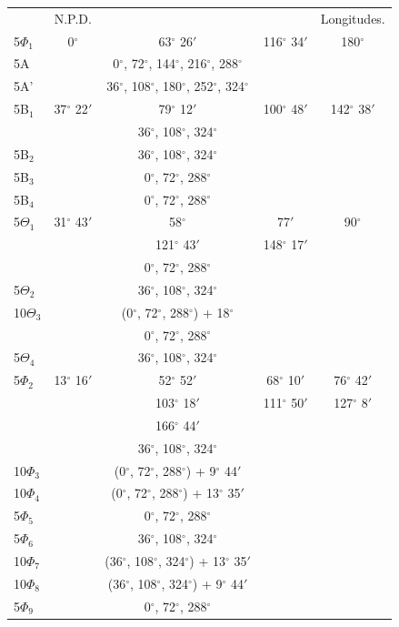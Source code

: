 \documentclass[11pt,a4paper]{book}
\begin{document}
\begin{center}
\begin{tabular}{lcccc}
 & N.P.D. & & & Longitudes. \\
5$\Phi_1$ & 0$^\circ$ & 63$^\circ$ 26$'$ & 116$^\circ$ 34$'$ & 180$^\circ$ \\
5A & & 0$^\circ$, 72$^\circ$, 144$^\circ$, 216$^\circ$, 288$^\circ$ & & \\
5A' & & 36$^\circ$, 108$^\circ$, 180$^\circ$, 252$^\circ$, 324$^\circ$ & & \\
5B$_1$ & 37$^\circ$ 22$'$ & 79$^\circ$ 12$'$ & 100$^\circ$ 48$'$ & 142$^\circ$ 38$'$ \\
 & & 36$^\circ$, 108$^\circ$, 324$^\circ$ & & \\
5B$_2$ & & 36$^\circ$, 108$^\circ$, 324$^\circ$ & & \\
5B$_3$ & & 0$^\circ$, 72$^\circ$, 288$^\circ$ & & \\
5B$_4$ & & 0$^\circ$, 72$^\circ$, 288$^\circ$ & & \\
5$\Theta_1$ & 31$^\circ$ 43$'$ & 58$^\circ$ & 77$'$ & 90$^\circ$ \\
 & & 121$^\circ$ 43$'$ & 148$^\circ$ 17$'$ & \\
 & & 0$^\circ$, 72$^\circ$, 288$^\circ$ & & \\
5$\Theta_2$ & & 36$^\circ$, 108$^\circ$, 324$^\circ$ & & \\
10$\Theta_3$ & & (0$^\circ$, 72$^\circ$, 288$^\circ$) + 18$^\circ$ & & \\
 & & 0$^\circ$, 72$^\circ$, 288$^\circ$ & & \\
5$\Theta_4$ & & 36$^\circ$, 108$^\circ$, 324$^\circ$ & & \\
5$\Phi_2$ & 13$^\circ$ 16$'$ & 52$^\circ$ 52$'$ & 68$^\circ$ 10$'$ & 76$^\circ$ 42$'$ \\
 & & 103$^\circ$ 18$'$ & 111$^\circ$ 50$'$ & 127$^\circ$ 8$'$ \\
 & & 166$^\circ$ 44$'$ & & \\
 & & 36$^\circ$, 108$^\circ$, 324$^\circ$ & & \\
10$\Phi_3$ & & (0$^\circ$, 72$^\circ$, 288$^\circ$) + 9$^\circ$ 44$'$ & & \\
10$\Phi_4$ & & (0$^\circ$, 72$^\circ$, 288$^\circ$) + 13$^\circ$ 35$'$ & & \\
5$\Phi_5$ & & 0$^\circ$, 72$^\circ$, 288$^\circ$ & & \\
5$\Phi_6$ & & 36$^\circ$, 108$^\circ$, 324$^\circ$ & & \\
10$\Phi_7$ & & (36$^\circ$, 108$^\circ$, 324$^\circ$) + 13$^\circ$ 35$'$ & & \\
10$\Phi_8$ & & (36$^\circ$, 108$^\circ$, 324$^\circ$) + 9$^\circ$ 44$'$ & & \\
5$\Phi_9$ & & 0$^\circ$, 72$^\circ$, 288$^\circ$ & & \\
\end{tabular}
\end{center}
\end{document}
